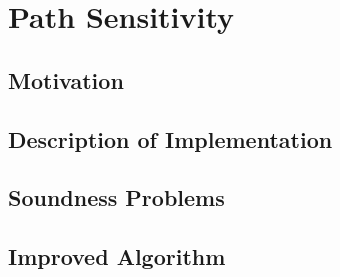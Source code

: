 \section{Path Sensitivity}
\subsection{Motivation}
\subsection{Description of Implementation}
\subsection{Soundness Problems}
\subsection{Improved Algorithm}

